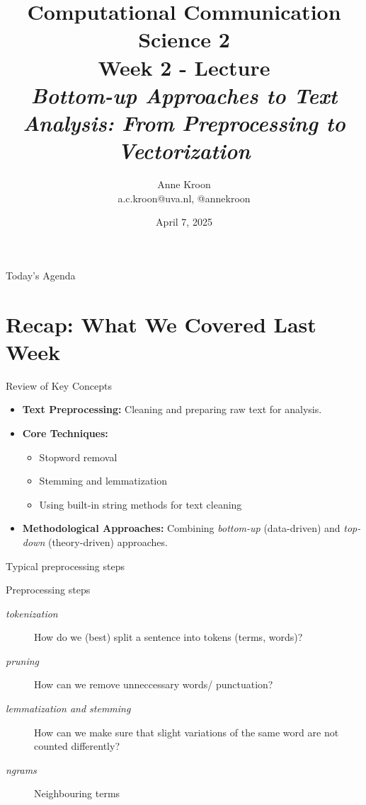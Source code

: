 \documentclass[handout]{beamer}
\title[Computational Communication Science 2]{\textbf{Computational Communication Science 2} \\Week 2 - Lecture\\ \emph{Bottom-up Approaches to Text Analysis: From Preprocessing to Vectorization}}
\author[Anne Kroon]{Anne Kroon \\ \footnotesize{a.c.kroon@uva.nl, @annekroon}}
\date{April 7, 2025}
\institute[Digital Society Minor, University of Amsterdam]{Digital Society Minor, University of Amsterdam}
\begin{document}
\begin{frame}{}
	\titlepage
\end{frame}

\begin{frame}{Today’s Agenda}
	\begin{tiny}
		\tableofcontents
	\end{tiny}
\end{frame}

\section{Recap: What We Covered Last Week}

\begin{frame}{Review of Key Concepts}
	\begin{itemize}
		\item \textbf{Text Preprocessing:} Cleaning and preparing raw text for analysis.
		\item \textbf{Core Techniques:}
		\begin{itemize}
			\item Stopword removal
			\item Stemming and lemmatization
			\item Using built-in string methods for text cleaning
		\end{itemize}
		\item \textbf{Methodological Approaches:} Combining \emph{bottom-up} (data-driven) and \emph{top-down} (theory-driven) approaches.
	\end{itemize}
\end{frame}

\begin{frame}{Typical preprocessing steps}
	\begin{block}{Preprocessing steps}
		\begin{description}
			\item [\emph{tokenization}] How do we (best) split a sentence into tokens (terms, words)?
			\item [\emph{pruning}] How can we remove unneccessary words/ punctuation?
			\item [\emph{lemmatization and stemming}] How can we make sure that slight variations of the same word are not counted differently?
			\item [\emph{ngrams}] Neighbouring terms
		\end{description}
	\end{block}
\end{frame}
\end{document}

